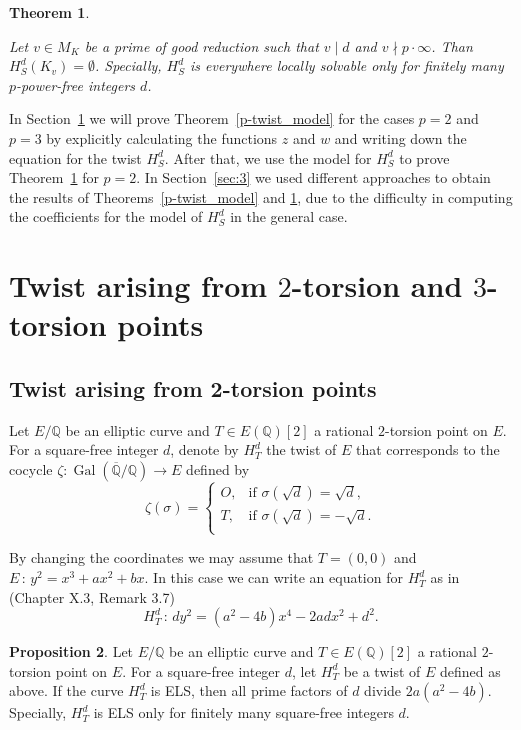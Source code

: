 \documentclass[a4paper, 12pt]{amsart}
\newtheorem{theorem}{Theorem}[section]
\theoremstyle{definition}
\newtheorem{proposition}[theorem]{Proposition}
\theoremstyle{remark}
\newcommand{\GalQ}{\operatorname{Gal}(\overline{\mathbb{Q}}/\mathbb{Q})}
\newcommand{\whichbold}[1]{\mathbb{#1}} %
\newcommand{\Q}{\whichbold{Q}}
\numberwithin{equation}{section}
\begin{document}
\begin{theorem}\label{thm_Hd_ELS_1}
    
    Let $v \in M_K$ be a prime of good reduction such that $v\mid d$ and $v \nmid p \cdot \infty$. 
    Than $H_S^d(K_v) = \emptyset$.
    Specially, $H_S^d$ is everywhere locally solvable only for finitely many $p$-power-free integers $d$.
\end{theorem}

In Section~\ref{sec:2} we will prove Theorem~\ref{p-twist_model} for the cases $p=2$ and $p=3$ by explicitly calculating the functions $z$ and $w$ and writing down the equation for the twist $H_S^d$. After that, we use the model for $H_S^d$ to prove Theorem~\ref{thm_Hd_ELS_1} for $p=2$.
In Section~\ref{sec:3} we used different approaches to obtain the results of Theorems~\ref{p-twist_model} and \ref{thm_Hd_ELS_1}, due to the difficulty in computing the coefficients for the model of $H_S^d$ in the general case.

\section{Twist arising from \texorpdfstring{$2$}{2}-torsion and \texorpdfstring{$3$}{3}-torsion points}\label{sec:2}

\subsection{Twist arising from 2-torsion points}\label{sec:2.1}

Let $E/\Q$ be an elliptic curve and $T\in E(\Q)[2]$ a rational $2$-torsion point on $E$. For a square-free integer $d$, denote by $H^d_T$ the twist of $E$ that corresponds to the cocycle $\zeta : \GalQ \to E$ defined by 
\[
    \zeta (\sigma)=
    \begin{cases}
        O, & \text{if } \sigma(\sqrt{d})=\sqrt{d}, \\
        T, & \text{if } \sigma(\sqrt{d})=-\sqrt{d}.\\
    \end{cases}
\]

By changing the coordinates we may assume that $T=(0,0)$ and $E \,:\, y^2=x^3+ax^2+bx$.
In this case we can write an equation for $H^d_T$ as in \cite{silverman2009arithmetic} (Chapter X.3, Remark 3.7)
\[
    H^d_T \,:\, dy^2=(a^2-4b)x^4-2adx^2+d^2.
\]


\begin{proposition}\label{2-twist_els}
    Let $E/\Q$ be an elliptic curve and $T\in E(\Q)[2]$ a rational $2$-torsion point on $E$. For a square-free integer $d$, let $H^d_T$ be a twist of $E$ defined as above.
    If the curve $H^d_T$ is ELS, then all prime factors of $d$ divide $2a(a^2-4b)$.
    Specially, $H^d_T$ is ELS only for finitely many square-free integers $d$.
\end{proposition}
\end{document}
